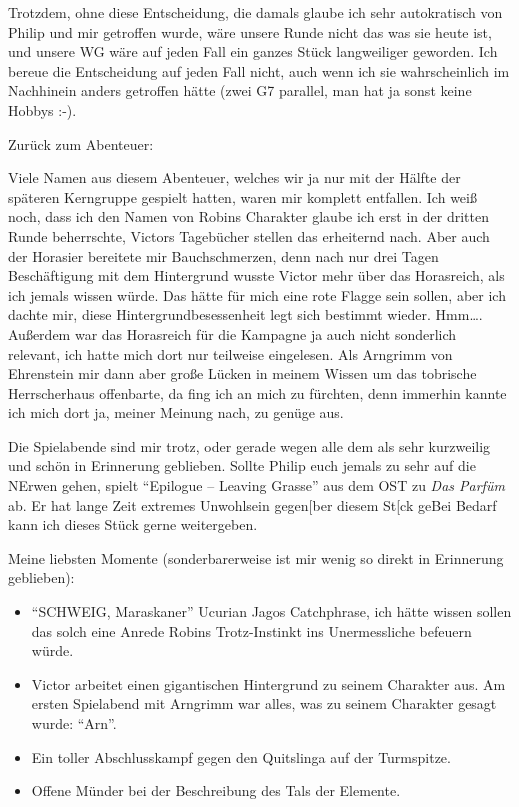 Trotzdem, ohne diese Entscheidung, die damals glaube ich sehr autokratisch von Philip und mir getroffen wurde, wäre unsere Runde nicht das was sie heute ist, und unsere WG wäre auf jeden Fall ein ganzes Stück langweiliger geworden. Ich bereue die Entscheidung auf jeden Fall nicht, auch wenn ich sie wahrscheinlich im Nachhinein anders getroffen hätte (zwei G7 parallel, man hat ja sonst keine Hobbys :-).

Zurück zum Abenteuer: 

Viele Namen aus diesem Abenteuer, welches wir ja nur mit der Hälfte der späteren Kerngruppe gespielt hatten, waren mir komplett entfallen. Ich weiß noch, dass ich den Namen von Robins Charakter glaube ich erst in der dritten Runde beherrschte, Victors Tagebücher stellen das erheiternd nach. Aber auch der Horasier bereitete mir Bauchschmerzen, denn nach nur drei Tagen Beschäftigung mit dem Hintergrund wusste Victor mehr über das Horasreich, als ich jemals wissen würde. Das hätte für mich eine rote Flagge sein sollen, aber ich dachte mir, diese Hintergrundbesessenheit legt sich bestimmt wieder. Hmm\dots. Außerdem war das Horasreich für die Kampagne ja auch nicht sonderlich relevant, ich hatte mich dort nur teilweise eingelesen. Als Arngrimm von Ehrenstein mir dann aber große Lücken in meinem Wissen um das tobrische Herrscherhaus offenbarte, da fing ich an mich zu fürchten, denn immerhin kannte ich mich dort ja, meiner Meinung nach, zu genüge aus.

Die Spielabende sind mir trotz, oder gerade wegen alle dem als sehr kurzweilig und schön in Erinnerung geblieben. Sollte Philip euch jemals zu sehr auf die NErwen gehen, spielt ``Epilogue -- Leaving Grasse'' aus dem OST zu \emph{Das Parfüm} ab. Er hat lange Zeit extremes Unwohlsein gegen[ber diesem St[ck geBei Bedarf kann ich dieses Stück gerne weitergeben.


Meine liebsten Momente (sonderbarerweise ist mir wenig so direkt in Erinnerung geblieben):


\begin{itemize}
\item ``SCHWEIG, Maraskaner'' Ucurian Jagos Catchphrase, ich hätte wissen sollen das solch eine Anrede Robins Trotz-Instinkt ins Unermessliche befeuern würde.
\item Victor arbeitet einen gigantischen Hintergrund zu seinem Charakter aus. Am ersten Spielabend mit Arngrimm war alles, was zu seinem Charakter  gesagt wurde: ``Arn''.
\item Ein toller Abschlusskampf gegen den Quitslinga auf der Turmspitze.
\item Offene Münder bei der Beschreibung des Tals der Elemente.
\end{itemize}

